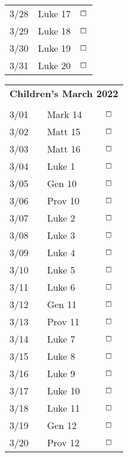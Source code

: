 \documentclass[10pt,landscape,letterpaper]{article}
\begin{document}
\begin{multicols}{5}
\begin{tabular}{p{0.5in}p{0.65in}p{0.3in}}
3/28 & Luke 17 & $\boxempty$ \\
3/29 & Luke 18 & $\boxempty$ \\
3/30 & Luke 19 & $\boxempty$ \\
3/31 & Luke 20 & $\boxempty$ \\

\end{tabular}



\begin{tabular}{p{0.5in}p{0.65in}p{0.3in}}
\multicolumn{3}{c}{\textbf{Children's March 2022}} \\
     &       &             \\
3/01 & Mark 14 & $\boxempty$ \\
3/02 & Matt 15 & $\boxempty$ \\
3/03 & Matt 16 & $\boxempty$ \\
3/04 & Luke 1 & $\boxempty$ \\
\textcolor[rgb]{1.00,0.00,0.00}{3/05} & \textcolor[rgb]{1.00,0.00,0.00}{Gen 10} & $\boxempty$ \\
\textcolor[rgb]{1.00,0.00,0.00}{3/06} & \textcolor[rgb]{1.00,0.00,0.00}{Prov 10} & $\boxempty$ \\

3/07 & Luke 2 & $\boxempty$ \\
3/08 & Luke 3 & $\boxempty$ \\
3/09 & Luke 4 & $\boxempty$ \\
3/10 & Luke 5 & $\boxempty$ \\
3/11 & Luke 6 & $\boxempty$ \\
\textcolor[rgb]{1.00,0.00,0.00}{3/12} & \textcolor[rgb]{1.00,0.00,0.00}{Gen 11} & $\boxempty$ \\
\textcolor[rgb]{1.00,0.00,0.00}{3/13} & \textcolor[rgb]{1.00,0.00,0.00}{Prov 11} & $\boxempty$ \\

3/14 & Luke 7 & $\boxempty$ \\
3/15 & Luke 8 & $\boxempty$ \\
3/16 & Luke 9 & $\boxempty$ \\
3/17 & Luke 10 & $\boxempty$ \\
3/18 & Luke 11 & $\boxempty$ \\
\textcolor[rgb]{1.00,0.00,0.00}{3/19} & \textcolor[rgb]{1.00,0.00,0.00}{Gen 12} & $\boxempty$ \\
\textcolor[rgb]{1.00,0.00,0.00}{3/20} & \textcolor[rgb]{1.00,0.00,0.00}{Prov 12} & $\boxempty$ \\


\end{tabular}
\end{multicols}
\end{document}
